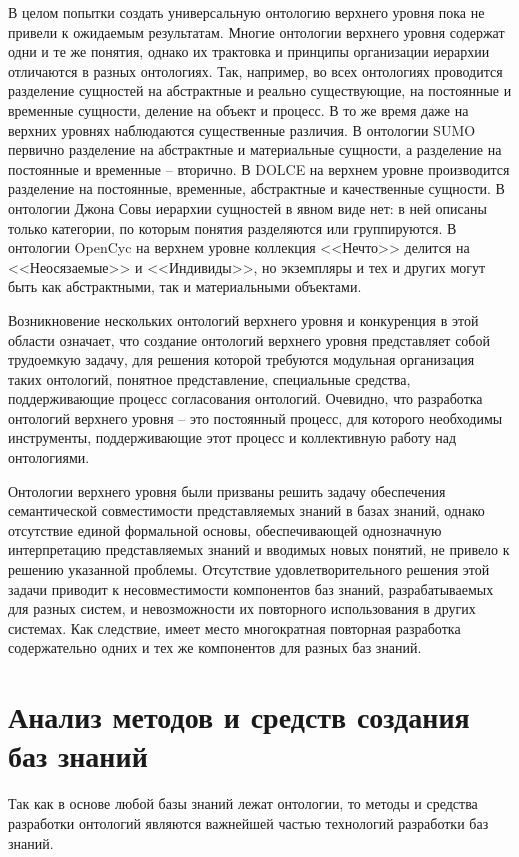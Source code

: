 В целом попытки создать универсальную онтологию верхнего уровня пока не привели к ожидаемым результатам. Многие онтологии верхнего уровня содержат одни и те же понятия, однако их трактовка и принципы организации иерархии отличаются в разных онтологиях. Так, например, во всех онтологиях проводится разделение сущностей на абстрактные и реально существующие, на постоянные и временные сущности, деление на объект и процесс. В то же время даже на верхних уровнях наблюдаются существенные различия. В онтологии SUMO первично разделение на абстрактные и материальные сущности, а разделение на постоянные и временные – вторично. В DOLCE на верхнем уровне производится разделение на постоянные, временные, абстрактные и качественные сущности. В онтологии Джона Совы иерархии сущностей в явном виде нет: в ней описаны только категории, по которым понятия разделяются или группируются. В онтологии OpenCyc на верхнем уровне коллекция <<Нечто>> делится на <<Неосязаемые>> и <<Индивиды>>, но экземпляры и тех и других могут быть как абстрактными, так и материальными объектами. 

Возникновение нескольких онтологий верхнего уровня и конкуренция в этой области означает, что
создание онтологий верхнего уровня представляет собой трудоемкую задачу, для решения которой требуются модульная организация таких онтологий, понятное представление, специальные средства, поддерживающие процесс согласования онтологий. Очевидно, что разработка онтологий верхнего уровня -- это постоянный процесс, для которого необходимы инструменты, поддерживающие этот процесс и коллективную работу над онтологиями.

Онтологии верхнего уровня были призваны решить задачу обеспечения семантической совместимости представляемых знаний в базах знаний, однако отсутствие единой формальной основы, обеспечивающей однозначную интерпретацию представляемых знаний и вводимых новых понятий, не привело к решению указанной проблемы. Отсутствие удовлетворительного решения этой задачи приводит к несовместимости компонентов баз знаний, разрабатываемых для разных систем, и невозможности их повторного использования в других системах. Как следствие, имеет место многократная повторная разработка содержательно одних и тех же компонентов для разных баз знаний.

\newpage
\section{Анализ методов и средств создания баз знаний}

Так как в основе любой базы знаний лежат онтологии, то методы и средства разработки онтологий являются важнейшей частью технологий разработки баз знаний.

